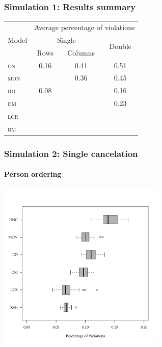 \documentclass[10pt,serif,professionalfont]{beamer}
\begin{document}
\begin{frame}
    \frametitle{Simulation 1: Results summary}

    \begin{center}
    \begin{tabular}{lccc}
    \toprule
     \multirow{3}{*}{Model} & \multicolumn{3}{c}{Average percentage of violations} \\ \cmidrule(lr){2-4}
                & \multicolumn{2}{c}{Single} & \multirow{2}{*}{Double} \\ \cmidrule(lr){2-3}
                  & Rows       & Columns    &            \\
    \midrule
     \textsc{un}  & 0.16 & 0.41 & 0.51 \\
     \textsc{mon} & \color{gray}{0.10} & 0.36 & 0.45 \\
     \textsc{iio} & 0.08 & \color{gray}{0.06} & 0.16 \\
     \textsc{dm}  & \color{gray}{0.08} & \color{gray}{0.11} & 0.23 \\
     \textsc{lcr} & \color{gray}{0.07} & \color{gray}{0.08} & \color{gray}{0.18} \\
     \textsc{rm}  & \color{gray}{0.06} & \color{gray}{0.09} & \color{gray}{0.20} \\
    \bottomrule
    \end{tabular}
    \end{center}



\end{frame}

\begin{frame}
    \frametitle{Simulation 2: Single cancelation}
        \framesubtitle{Person ordering}

    \centering \includegraphics[width=0.6\textwidth]{./figs/violations_columns_weighted.pdf}

\end{frame}
\end{document}
